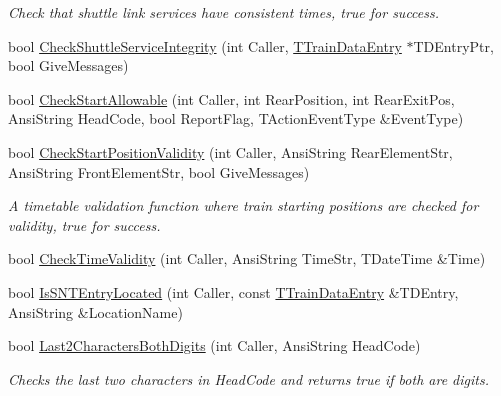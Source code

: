 \begin{DoxyCompactItemize}
\begin{DoxyCompactList}\small\item\em Check that shuttle link services have consistent times, true for success. \end{DoxyCompactList}\item 
bool \mbox{\hyperlink{class_t_train_controller_a161fe7b4bbf101fc0a3f7eadd3aff9ca}{Check\+Shuttle\+Service\+Integrity}} (int Caller, \mbox{\hyperlink{class_t_train_data_entry}{T\+Train\+Data\+Entry}} $\ast$T\+D\+Entry\+Ptr, bool Give\+Messages)
\item 
bool \mbox{\hyperlink{class_t_train_controller_ab8d8cf015d4784f12585f0ead325e9bf}{Check\+Start\+Allowable}} (int Caller, int Rear\+Position, int Rear\+Exit\+Pos, Ansi\+String Head\+Code, bool Report\+Flag, T\+Action\+Event\+Type \&Event\+Type)
\item 
\mbox{\label{class_t_train_controller_a5c9711cc69c8332cf7db5e0b2696ca45}} 
bool \mbox{\hyperlink{class_t_train_controller_a5c9711cc69c8332cf7db5e0b2696ca45}{Check\+Start\+Position\+Validity}} (int Caller, Ansi\+String Rear\+Element\+Str, Ansi\+String Front\+Element\+Str, bool Give\+Messages)
\begin{DoxyCompactList}\small\item\em A timetable validation function where train starting positions are checked for validity, true for success. \end{DoxyCompactList}\item 
bool \mbox{\hyperlink{class_t_train_controller_a523077cf0c9c02c8cb56dab0af9b0e52}{Check\+Time\+Validity}} (int Caller, Ansi\+String Time\+Str, T\+Date\+Time \&Time)
\item 
bool \mbox{\hyperlink{class_t_train_controller_a61cdbf0085d24c76aa84e7d5e1d11ead}{Is\+S\+N\+T\+Entry\+Located}} (int Caller, const \mbox{\hyperlink{class_t_train_data_entry}{T\+Train\+Data\+Entry}} \&T\+D\+Entry, Ansi\+String \&Location\+Name)
\item 
\mbox{\label{class_t_train_controller_a6fc210d266e7672ccc648c0a9ab4e542}} 
bool \mbox{\hyperlink{class_t_train_controller_a6fc210d266e7672ccc648c0a9ab4e542}{Last2\+Characters\+Both\+Digits}} (int Caller, Ansi\+String Head\+Code)
\begin{DoxyCompactList}\small\item\em Checks the last two characters in Head\+Code and returns true if both are digits. \end{DoxyCompactList}\item 

\end{DoxyCompactItemize}
